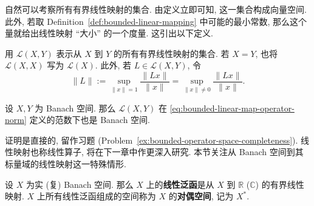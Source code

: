 自然可以考察所有有界线性映射的集合. 由定义立即可知, 这一集合构成向量空间. 此外, 若取 Definition~\ref{def:bounded-linear-mapping} 中可能的最小常数, 那么这个量就给出线性映射 ``大小'' 的一个度量. 这引出以下定义.

\begin{Definition}
\label{def:bounded-operator-space-norm}
用 $\mathcal{L}(X,Y)$ 表示从 $X$ 到 $Y$ 的所有有界线性映射的集合. 若 $X=Y$, 也将 $\mathcal{L}(X,X)$ 写为 $\mathcal{L}(X)$. 此外, 若 $L\in\mathcal{L}(X,Y)$, 令
\begin{equation}\label{eq:bounded-linear-map-operator-norm}
\|L\|:=\sup_{\|x\|=1}\dfrac{\|Lx\|}{\|x\|}=\sup_{\|x\|\ne0}\dfrac{\|Lx\|}{\|x\|}.
\end{equation}

\end{Definition}

\begin{Theorem}
\label{thm:bounded-operator-space-completeness}
设 $X,Y$ 为 Banach 空间. 那么 $\mathcal{L}(X,Y)$ 在 \eqref{eq:bounded-linear-map-operator-norm} 定义的范数下也是 Banach 空间.
\end{Theorem}

证明是直接的, 留作习题 (Problem~\ref{ex:bounded-operator-space-completeness}). 线性映射也称线性算子, 将在下一章中作更深入研究. 本节关注从 Banach 空间到其标量域的线性映射这一特殊情形.

\begin{Definition}
\label{def:linear-functional-dual-space}
设 $X$ 为实 (复) Banach 空间. 那么 $X$ 上的\textbf{线性泛函}是从 $X$ 到 $\mathbb{R}$ ($\mathbb{C}$) 的有界线性映射. $X$ 上所有线性泛函组成的空间称为 $X$ 的\textbf{对偶空间}, 记为 $X^*$.
\end{Definition}
